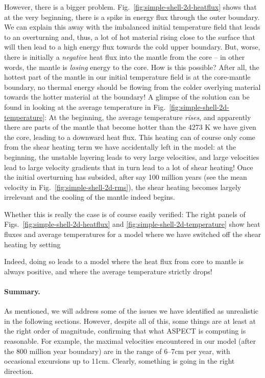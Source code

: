 \documentclass{article}
\newcommand{\aspect}{\textsc{ASPECT}}
\begin{document}
However, there is a bigger problem. Fig.~\ref{fig:simple-shell-2d-heatflux}
shows that at the very beginning, there is a spike in energy flux through the
outer boundary. We can explain this away with the imbalanced initial temperature
field that leads to an overturning and, thus, a lot of hot material rising close
to the surface that will then lead to a high energy flux towards the cold upper
boundary. But, worse, there is initially a \textit{negative} heat flux into the
mantle from the core -- in other words, the mantle is \textit{losing} energy to
the core. How is this possible? After all, the hottest part of the mantle in our
initial temperature field is at the core-mantle boundary, no thermal energy
should be flowing from the colder overlying material towards the hotter material
at the boundary! A glimpse of the solution can be found in looking at the
average temperature in Fig.~\ref{fig:simple-shell-2d-temperature}: At the
beginning, the average temperature \textit{rises}, and apparently there are
parts of the mantle that become hotter than the 4273 K we have given the core,
leading to a downward heat flux. This heating can of course only come from the
shear heating term we have accidentally left in the model: at the beginning, the
unstable layering leads to very large velocities, and large velocities lead to
large velocity gradients that in turn lead to a lot of shear heating! Once the
initial overturning has subsided, after say 100 million years (see the mean
velocity in Fig.~\ref{fig:simple-shell-2d-rms}), the shear heating becomes
largely irrelevant and the cooling of the mantle indeed begins.

Whether this is really the case is of course easily verified: The right panels
of Figs.~\ref{fig:simple-shell-2d-heatflux}
and \ref{fig:simple-shell-2d-temperature} show heat fluxes and average
temperatures for a model where we have switched off the shear heating by setting



Indeed, doing so leads to a model where the heat flux from core to mantle is
always positive, and where the average temperature strictly drops!


\paragraph{Summary.} As mentioned, we will address some of the issues we have
identified as unrealistic in the following sections.
However, despite all of this, some things are at least at the right order of
magnitude, confirming that what \aspect{} is computing is reasonable. For
example, the maximal velocities encountered in our model (after the 800 million
year boundary) are in the range of 6--7cm per year, with occasional excursions
up to 11cm. Clearly, something is going in the right direction.
\end{document}
